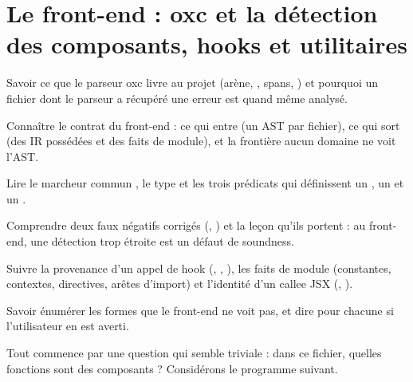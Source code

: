 \chapter{Le front-end : oxc et la détection des composants, hooks et utilitaires}
\label{chap:frontend-detection}

\begin{objectifs}
  \item Savoir ce que le parseur oxc livre au projet (arène, , spans, ) et pourquoi un fichier dont le parseur a récupéré une erreur est quand même analysé.
  \item Connaître le contrat du front-end : ce qui entre (un AST par fichier), ce qui sort (des IR possédées et des faits de module), et la frontière \og aucun domaine ne voit l'AST\fg{}.
  \item Lire le marcheur commun , le type  et les trois prédicats qui définissent un , un  et un .
  \item Comprendre deux faux négatifs corrigés (, ) et la leçon qu'ils portent : au front-end, une détection trop étroite est un défaut de soundness.
  \item Suivre la provenance d'un appel de hook (, , ), les faits de module (constantes, contextes, directives, arêtes d'import) et l'identité d'un callee JSX (, ).
  \item Savoir énumérer les formes que le front-end ne voit pas, et dire pour chacune si l'utilisateur en est averti.
\end{objectifs}


Tout commence par une question qui semble triviale : dans ce fichier, quelles fonctions sont des composants ? Considérons le programme suivant.

